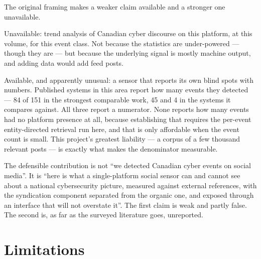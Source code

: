 \documentclass[11pt]{article}
\begin{document}
The original framing makes a weaker claim available and a stronger one
unavailable.

Unavailable: trend analysis of Canadian cyber discourse on this platform, at
this volume, for this event class. Not because the statistics are under-powered
--- though they are --- but because the underlying signal is mostly machine
output, and adding data would add feed posts.

Available, and apparently unusual: a sensor that reports its own blind spots
with numbers. Published systems in this area report how many events they
detected --- 84 of 151 in the strongest comparable work, 45 and 4 in the
systems it compares against. All three report a numerator. None reports how
many events had no platform presence at all, because establishing that requires
the per-event entity-directed retrieval run here, and that is only affordable
when the event count is small. This project's greatest liability --- a corpus
of a few thousand relevant posts --- is exactly what makes the denominator
measurable.

\begin{keybox}
The defensible contribution is not ``we detected Canadian cyber events on
social media''. It is ``here is what a single-platform social sensor can and
cannot see about a national cybersecurity picture, measured against external
references, with the syndication component separated from the organic one, and
exposed through an interface that will not overstate it''. The first claim is
weak and partly false. The second is, as far as the surveyed literature goes,
unreported.
\end{keybox}

\section{Limitations}
\end{document}

